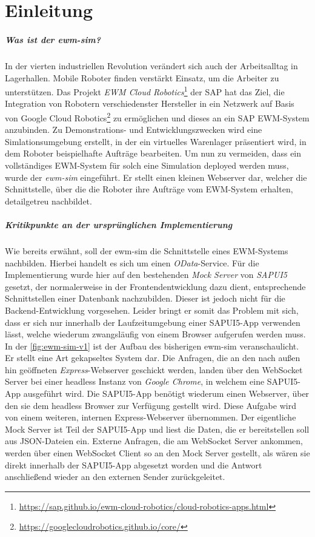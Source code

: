 \chapter{Einleitung}

\paragraph{Was ist der \ac{ewm-sim}?}
In der vierten industriellen Revolution verändert sich auch der Arbeitsalltag in Lagerhallen.
Mobile Roboter finden verstärkt Einsatz, um die Arbeiter zu unterstützen.
Das Projekt \emph{\ac{EWM} Cloud Robotics}\footnote{\url{https://sap.github.io/ewm-cloud-robotics/cloud-robotics-apps.html}} der SAP hat das Ziel, die Integration von Robotern verschiedenster Hersteller in ein Netzwerk auf Basis von Google Cloud Robotics\footnote{\url{https://googlecloudrobotics.github.io/core/}} zu ermöglichen und dieses an ein SAP \ac{EWM}-System anzubinden.
Zu Demonstrations- und Entwicklungszwecken wird eine Simlationsumgebung erstellt, in der ein virtuelles Warenlager präsentiert wird, in dem Roboter beispielhafte Aufträge bearbeiten.
Um nun zu vermeiden, dass ein vollständiges \ac{EWM}-System für solch eine Simulation deployed werden muss, wurde der \emph{\ac{ewm-sim}} eingeführt.
Er stellt einen kleinen Webserver dar, welcher die Schnittstelle, über die die Roboter ihre Aufträge vom \ac{EWM}-System erhalten, detailgetreu nachbildet.

\paragraph{Kritikpunkte an der ursprünglichen Implementierung}
Wie bereits erwähnt, soll der \ac{ewm-sim} die Schnittstelle eines \ac{EWM}-Systems nachbilden. Hierbei handelt es sich um einen \emph{\ac{OData}}-Service.
Für die Implementierung wurde hier auf den bestehenden \emph{Mock Server} von \emph{SAPUI5} gesetzt, der normalerweise in der Frontendentwicklung dazu dient, entsprechende Schnittstellen einer Datenbank nachzubilden.
Dieser ist jedoch nicht für die Backend-Entwicklung vorgesehen.
Leider bringt er somit das Problem mit sich, dass er sich nur innerhalb der Laufzeitumgebung einer SAPUI5-App verwenden lässt, welche wiederum zwangsläufig von einem Browser aufgerufen werden muss.
In der \autoref{fig:ewm-sim-v1} ist der Aufbau des bisherigen \ac{ewm-sim} veranschaulicht.
Er stellt eine Art gekapseltes System dar.
Die Anfragen, die an den nach außen hin geöffneten \emph{Express}-Webserver geschickt werden, landen über den WebSocket Server bei einer headless Instanz von \emph{Google Chrome}, in welchem eine SAPUI5-App ausgeführt wird.
Die SAPUI5-App benötigt wiederum einen Webserver, über den sie dem headless Browser zur Verfügung gestellt wird.
Diese Aufgabe wird von einem weiteren, internen Express-Webserver übernommen.
Der eigentliche Mock Server ist Teil der SAPUI5-App und liest die Daten, die er bereitstellen soll aus \ac{JSON}-Dateien ein.
Externe Anfragen, die am WebSocket Server ankommen, werden über einen WebSocket Client so an den Mock Server gestellt, als wären sie direkt innerhalb der SAPUI5-App abgesetzt worden und die Antwort anschließend wieder an den externen Sender zurückgeleitet.

